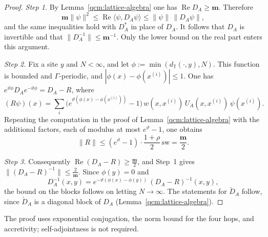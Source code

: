 \documentclass[11pt,letterpaper,reqno]{amsart}
\theoremstyle{definition}
\begin{document}
\begin{proof}
\emph{Step 1.}
By Lemma~\ref{qcm:lattice-algebra} one has $\operatorname{Re}D_A\ge\mathbf m$.
Therefore
\begin{equation*}
\mathbf m\|\psi\|^2\le\operatorname{Re}\langle\psi,D_A\psi\rangle\le\|\psi\|\,\|D_A\psi\|,
\end{equation*}
and the same inequalities hold with $D_A^*$ in place of $D_A$.
It follows that $D_A$ is invertible and that $\|D_A^{-1}\|\le\mathbf m^{-1}$.
Only the lower bound on the real part enters this argument.

\emph{Step 2.}
Fix a site $y$ and $N<\infty$, and let $\phi:=\min(d_{\mathbb T}(\cdot,y),N)$.
This function is bounded and $\Gamma$-periodic, and $|\phi(x)-\phi(x^{(i)})|\le1$.
One has $e^{\vartheta\phi}D_Ae^{-\vartheta\phi}=D_A-R$, where
\begin{equation*}
(R\psi)(x)=\sum_i\bigl(e^{\vartheta(\phi(x)-\phi(x^{(i)}))}-1\bigr)\,w(x,x^{(i)})\,U_A(x,x^{(i)})\,\psi(x^{(i)}).
\end{equation*}
Repeating the computation in the proof of Lemma~\ref{qcm:lattice-algebra} with the additional factors, each of modulus at most $e^{\vartheta}-1$, one obtains
\begin{equation*}
\|R\|\le(e^{\vartheta}-1)\cdot\frac{1+\rho}{2}\,\mathrm{sw}=\frac{\mathbf m}{2}.
\end{equation*}

\emph{Step 3.}
Consequently $\operatorname{Re}(D_A-R)\ge\frac{\mathbf m}{2}$, and Step~1 gives $\|(D_A-R)^{-1}\|\le\frac{2}{\mathbf m}$.
Since $\phi(y)=0$ and
\begin{equation*}
D_A^{-1}(x,y)=e^{-\vartheta(\phi(x)-\phi(y))}\,(D_A-R)^{-1}(x,y),
\end{equation*}
the bound on the blocks follows on letting $N\to\infty$.
The statements for $\check D_A$ follow, since $\check D_A$ is a diagonal block of $D_A$ (Lemma~\ref{qcm:lattice-algebra}).
\end{proof}

The proof uses exponential conjugation, the norm bound for the four hops, and accretivity; self-adjointness is not required.
\end{document}
